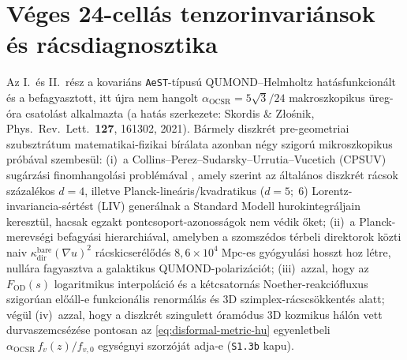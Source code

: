 \documentclass[11pt,a4paper]{article}
\begin{document}
\section{Véges 24-cellás tenzorinvariánsok és rácsdiagnosztika}
\label{sec:step3-isotropy-hu}
Az I.\ \'es II.~r\'esz a kovari\'ans \texttt{AeST}-t\'ipus\'u QUMOND--Helmholtz hat\'asfunkcion\'alt \'es a befagyasztott, itt \'ujra nem hangolt $\alpha_{\mathrm{OCSR}} = 5\sqrt{3}/24$ makroszkopikus \"ureg-\'ora csatol\'ast alkalmazta (a hat\'as szerkezete: Skordis \& Z{\l}o{\'s}nik, Phys.\ Rev.\ Lett.\ \textbf{127}, 161302, 2021). Bármely diszkrét pre-geometriai szubsztrátum matematikai-fizikai bírálata azonban négy szigorú mikroszkopikus próbával szembesül:
(i)~a Collins--Perez--Sudarsky--Urrutia--Vucetich (CPSUV) sugárzási finomhangolási problémával \cite{Collins2004}, amely szerint az általános diszkrét rácsok százalékos $d = 4$, illetve Planck-lineáris/kvadratikus ($d = 5;\; 6$) Lorentz-invariancia-sértést (LIV) generálnak a Standard Modell hurokintegráljain keresztül, hacsak egzakt pontcsoport-azonosságok nem védik őket;
(ii)~a Planck-merevségi befagyási hierarchiával, amelyben a szomszédos térbeli direktorok közti naiv $\kappa_{\mathrm{dir}}^{\mathrm{bare}}(\nabla u)^2$ rácskicserélődés $8{,}6\times 10^4\;\mathrm{Mpc}$-es gyógyulási hosszt hoz létre, nullára fagyasztva a galaktikus QUMOND-polarizációt;
(iii)~azzal, hogy az $F_{\mathrm{OD}}(s)$ logaritmikus interpoláció és a kétcsatornás Noether-reakciófluxus szigorúan előáll-e funkcionális renormálás és 3D szimplex-rácscsökkentés alatt; végül
(iv)~azzal, hogy a diszkrét szingulett óramódus 3D kozmikus hálón vett durvaszemcsézése pontosan az \eqref{eq:disformal-metric-hu} egyenletbeli $\alpha_{\mathrm{OCSR}}\,f_v(z)/f_{v,0}$ egységnyi szorzóját adja-e (\texttt{S1.3b} kapu).
\end{document}
